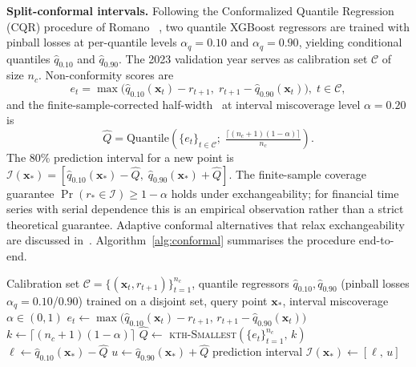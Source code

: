 \textbf{Split-conformal intervals.}
Following the Conformalized Quantile Regression (CQR) procedure of Romano
\etal~\cite{romano2019cqr}, two quantile XGBoost regressors are trained with
pinball losses at per-quantile levels $\alpha_q\!=\!0.10$ and
$\alpha_q\!=\!0.90$, yielding conditional quantiles $\hat{q}_{0.10}$ and
$\hat{q}_{0.90}$. The 2023 validation year serves as calibration set
$\mathcal{C}$ of size $n_c$. Non-conformity scores are
\begin{equation}
e_t = \max\!\bigl(\hat{q}_{0.10}(\mathbf{x}_t)-r_{t+1},\;
                   r_{t+1}-\hat{q}_{0.90}(\mathbf{x}_t)\bigr),\;t\in\mathcal{C},
\label{eq:ncscores}
\end{equation}
and the finite-sample-corrected half-width~\cite{vovk2005conformal,angelopoulos2023gentle}
at interval miscoverage level $\alpha=0.20$ is
\begin{equation}
\hat{Q} = \mathrm{Quantile}\!\!\left(\{e_t\}_{t\in\mathcal{C}};\;
  \tfrac{\lceil(n_c+1)(1-\alpha)\rceil}{n_c}\right)\!.
\label{eq:confwidth}
\end{equation}
The 80\% prediction interval for a new point is
$\mathcal{I}(\mathbf{x}_*) = [\hat{q}_{0.10}(\mathbf{x}_*)-\hat{Q},\;
\hat{q}_{0.90}(\mathbf{x}_*)+\hat{Q}]$.
The finite-sample coverage guarantee $\Pr(r_{*}\in\mathcal{I})\geq 1-\alpha$
holds under exchangeability; for financial time series with serial dependence
this is an empirical observation rather than a strict theoretical guarantee.
Adaptive conformal alternatives that relax exchangeability are discussed
in~\cite{gibbs2021adaptive,tibshirani2019covariate}.
Algorithm~\ref{alg:conformal} summarises the procedure end-to-end.

\begin{algorithm}[t]
\caption{CQR Split-Conformal Prediction Interval at Level $1-\alpha$ \cite{romano2019cqr}}
\label{alg:conformal}
\begin{algorithmic}[1]
\Require Calibration set $\mathcal{C}=\{(\mathbf{x}_t,r_{t+1})\}_{t=1}^{n_c}$,
         quantile regressors $\hat{q}_{0.10},\hat{q}_{0.90}$ (pinball losses
         $\alpha_q\!=\!0.10$/$0.90$) trained on a disjoint set,
         query point $\mathbf{x}_{*}$, interval miscoverage $\alpha\in(0,1)$
  \State $e_t\gets\max\bigl(\hat{q}_{0.10}(\mathbf{x}_t)-r_{t+1},\,r_{t+1}-\hat{q}_{0.90}(\mathbf{x}_t)\bigr)$
\EndFor
\State $k\gets\bigl\lceil(n_c+1)(1-\alpha)\bigr\rceil$
\State $\hat{Q}\gets$ \textsc{kth-Smallest}$(\{e_t\}_{t=1}^{n_c},\,k)$
\State $\ell\gets\hat{q}_{0.10}(\mathbf{x}_{*})-\hat{Q}$
\State $u\gets\hat{q}_{0.90}(\mathbf{x}_{*})+\hat{Q}$
\State \Return prediction interval $\mathcal{I}(\mathbf{x}_{*})\gets[\ell,\,u]$
\end{algorithmic}
\end{algorithm}


